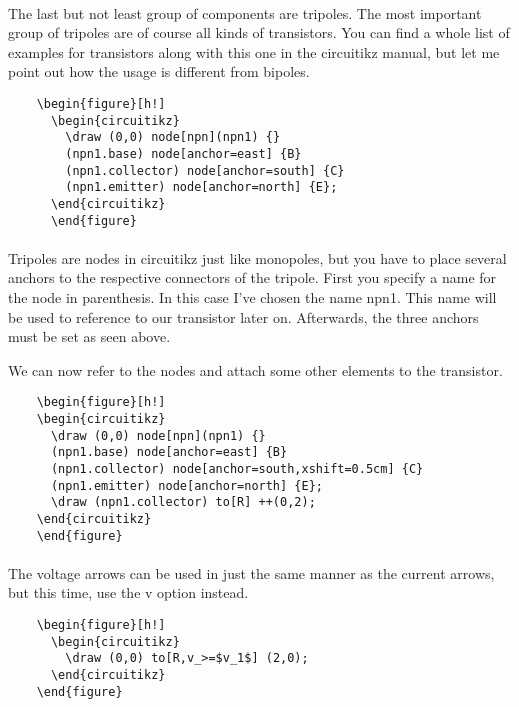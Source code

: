   \paragraph{}
  The last but not least group of components are tripoles. The most important group of tripoles are of course all kinds of transistors. You can find a whole list of examples for transistors along with this one in the circuitikz manual, but let me point out how the usage is different from bipoles.
  \begin{lstlisting}
    \begin{figure}[h!]
      \begin{circuitikz}
        \draw (0,0) node[npn](npn1) {}
        (npn1.base) node[anchor=east] {B}
        (npn1.collector) node[anchor=south] {C}
        (npn1.emitter) node[anchor=north] {E};
      \end{circuitikz}
      \end{figure}
  \end{lstlisting}   
  \paragraph{}
  Tripoles are nodes in circuitikz just like monopoles, but you have to place several anchors to the respective connectors of the tripole. First you specify a name for the node in parenthesis. In this case I've chosen the name npn1. This name will be used to reference to our transistor later on. Afterwards, the three anchors must be set as seen above.

  We can now refer to the nodes and attach some other elements to the transistor.

  \begin{lstlisting}
    \begin{figure}[h!]
    \begin{circuitikz}
      \draw (0,0) node[npn](npn1) {}
      (npn1.base) node[anchor=east] {B}
      (npn1.collector) node[anchor=south,xshift=0.5cm] {C}
      (npn1.emitter) node[anchor=north] {E};
      \draw (npn1.collector) to[R] ++(0,2);
    \end{circuitikz}
    \end{figure}
  \end{lstlisting} 
  
  \paragraph{}
  The voltage arrows can be used in just the same manner as the current arrows, but this time, use the v option instead.
  \begin{lstlisting}
    \begin{figure}[h!]
      \begin{circuitikz}
        \draw (0,0) to[R,v_>=$v_1$] (2,0);
      \end{circuitikz}
    \end{figure}
  \end{lstlisting} 

